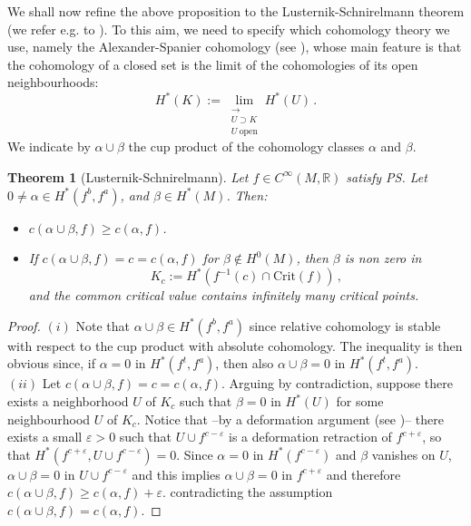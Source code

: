 \documentclass{article}
\newcommand{\1}{\mathbbm{1}}
\newtheorem{thm}{Theorem}[section]
\theoremstyle{remark}
\begin{document}
{{\noindent We shall now refine the above proposition to the Lusternik-Schnirelmann theorem (we refer e.g. to \cite[Proposition 2.2]{vit92}). To this aim, we need to specify which cohomology theory we use, namely the Alexander-Spanier cohomology (see \cite[p. 307]{Spanier}), whose main feature is that  the cohomology of a closed set is the limit of the cohomologies of its open neighbourhoods:
\begin{equation*}
    H^*(K):=\lim_{\substack{\longrightarrow \\ U\supset K \\ U \ \mathrm{open}}} H^*(U)\, .
\end{equation*}
We indicate by $\alpha\cup\beta$ the cup product of the cohomology classes $\alpha$ and $\beta$.
\begin{thm} [Lusternik-Schnirelmann] \label{thm:lusSch}
Let $f \in C^{\infty}(M,\mathbb{R})$ satisfy PS. Let $0 \ne \alpha \in H^*(f^b,f^a)$, and $\beta \in H^*(M)$. Then:
\begin{itemize}
\item[$(i)$] $c(\alpha\cup \beta,f) \ge c(\alpha,f)$.
\item[$(ii)$] If $c(\alpha \cup \beta,f) = c = c(\alpha,f)$ for $\beta\not\in H^0(M)$, then $\beta$ is non zero in 
$$K_c := H^*(f^{-1}(c) \cap \text{Crit}(f))\, ,$$ 
and the common critical value contains infinitely many critical points. 
\end{itemize}
\end{thm}
\begin{proof}
\noindent $(i)$ Note that  $\alpha \cup \beta \in H^*(f^b,f^a)$ since relative cohomology is stable with respect to the cup product with absolute cohomology. The inequality is then obvious since, if $\alpha = 0$ in $H^*(f^{t},f^a)$, then also $\alpha \cup \beta = 0$ in $H^*(f^{t},f^a)$. \\
$(ii)$ Let $c(\alpha \cup \beta,f) = c = c(\alpha,f)$. Arguing by contradiction, suppose there exists a neighborhood $U$ of $K_c$ such that $\beta = 0$ in $H^*(U)$ for some neighbourhood $U$ of $K_c$.
Notice that --by a deformation argument (see \cite[Theorem 7.6]{Car})-- there exists a small $\varepsilon > 0$ such that $U \cup f^{c-\varepsilon}$ is a deformation retraction of $f^{c+\varepsilon}$, so that $H^*(f^{c+\varepsilon}, U \cup f^{c-\varepsilon}) = 0$. Since $\alpha=0$ in $H^*(f^{c- \varepsilon})$ and $\beta$ vanishes on $U$, $\alpha \cup \beta = 0$ in $U \cup f^{c-\varepsilon}$ and this implies $\alpha \cup \beta = 0$ in $f^{c+\varepsilon}$ and therefore $c(\alpha \cup \beta,f) \ge c(\alpha,f) + \varepsilon$. contradicting the assumption $c(\alpha \cup \beta,f) = c(\alpha,f)$.
\end{proof}
}}
\end{document}
